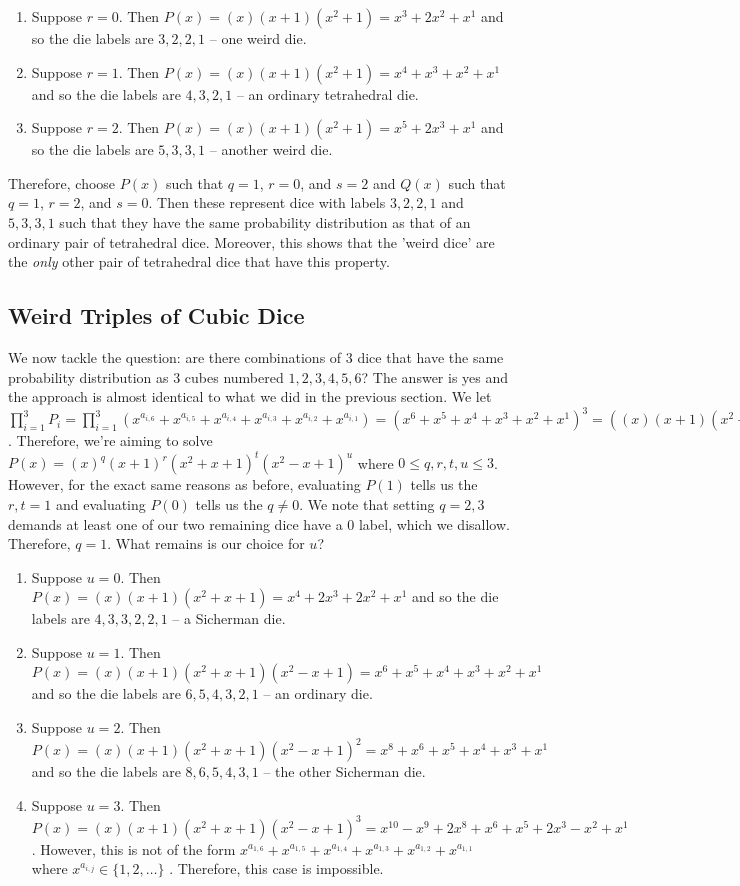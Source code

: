 \documentclass[12pt]{report}
\begin{document}
\begin{enumerate}
\item Suppose $r=0$. Then $P(x)=(x)(x+1)(x^{2}+1)=x^{3}+2x^{2}+x^{1}$ and so the die labels are $3,2,2,1$ -- one weird die.
\item Suppose $r=1$. Then $P(x)=(x)(x+1)(x^{2}+1)=x^{4}+x^{3}+x^{2}+x^{1}$ and so the die labels are $4,3,2,1$ -- an ordinary tetrahedral die.
\item Suppose $r=2$. Then $P(x)=(x)(x+1)(x^{2}+1)=x^{5}+2x^{3}+x^{1}$ and so the die labels are $5,3,3,1$ -- another weird die.
\end{enumerate}

Therefore, choose $P(x)$ such that $q=1$, $r=0$, and $s=2$ and $Q(x)$ such that $q=1$, $r=2$, and $s=0$. Then
these represent dice with labels $3,2,2,1$ and $5,3,3,1$ such that they have the same probability distribution
as that of an ordinary pair of tetrahedral dice. Moreover, this shows that the 'weird dice' are the
\textit{only} other pair of tetrahedral dice that have this property.

\subsection*{Weird Triples of Cubic Dice}
We now tackle the question: are there combinations of 3 dice that have the same probability distribution as 3
cubes numbered $1,2,3,4,5,6$? The answer is yes and the approach is almost identical to what we did in the
previous section. We let
$\prod_{i=1}^{3} P_{i}=\prod_{i=1}^{3}(x^{a_{i,6}}+x^{a_{i,5}}+x^{a_{i,4}}+x^{a_{i,3}}+x^{a_{i,2}}+x^{a_{i,1}})=(x^{6}+x^{5}+x^{4}+x^{3}+x^{2}+x^{1})^{3}=((x)(x+1)(x^{2}+x+1)(x^{2}-x+1))^{3}$.
Therefore, we're aiming to solve $P(x)=(x)^{q}(x+1)^{r}(x^{2}+x+1)^{t}(x^{2}-x+1)^{u}$ where
$0\leq q,r,t,u\leq 3$. However, for the exact same reasons as before, evaluating $P(1)$ tells us the $r,t=1$
and evaluating $P(0)$ tells us the $q \neq 0$. We note that setting $q=2,3$ demands at least one of our two
remaining dice have a 0 label, which we disallow. Therefore, $q=1$. What remains is our choice for $u$?   

\begin{enumerate}
\item Suppose $u=0$. Then $P(x)=(x)(x+1)(x^{2}+x+1)=x^{4}+2x^{3}+2x^{2}+x^{1}$ and so the die labels are $4,3,3,2,2,1$ -- a Sicherman die.
\item Suppose $u=1$. Then $P(x)=(x)(x+1)(x^{2}+x+1)(x^{2}-x+1)=x^{6}+x^{5}+x^{4}+x^{3}+x^{2}+x^{1}$ and so the die labels are $6,5,4,3,2,1$ -- an ordinary die.
\item Suppose $u=2$. Then $P(x)=(x)(x+1)(x^{2}+x+1)(x^{2}-x+1)^{2}=x^{8}+x^{6}+x^{5}+x^{4}+x^{3}+x^{1}$ and so the die labels are $8,6,5,4,3,1$ -- the other Sicherman die.
\item Suppose $u=3$. Then $P(x)=(x)(x+1)(x^{2}+x+1)(x^{2}-x+1)^{3}=x^{10}-x^{9}+2x^{8}+x^{6}+x^{5}+2x^{3}-x^{2}+x^{1}$. However, this is not of the form $x^{a_{1,6}}+x^{a_{1,5}}+x^{a_{1,4}}+x^{a_{1,3}}+x^{a_{1,2}}+x^{a_{1,1}}$ where $x^{a_{i,j}} \in \{1,2,\ldots\}$ . Therefore, this case is impossible.
\end{enumerate}
\end{document}
